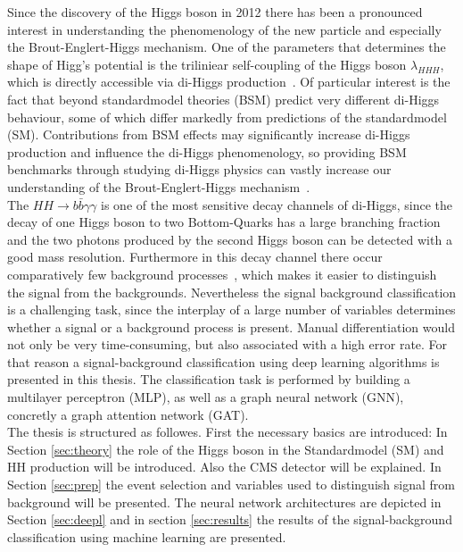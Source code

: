 \label{sec:introduction}

Since the discovery of the Higgs boson in 2012 there has been a pronounced interest in understanding the
phenomenology of the new particle and especially the Brout-Englert-Higgs mechanism. One of the parameters
that determines the shape of Higg's potential is the triliniear self-coupling of the Higgs boson $\lambda_{HHH}$,
which is directly accessible via di-Higgs production~\cite{CMS:2021qbp, HandbookLHC}. Of particular interest is the fact that beyond standardmodel theories (BSM) 
predict very different di-Higgs behaviour, some of which differ markedly from predictions of the standardmodel (SM).
Contributions from BSM effects may significantly increase di-Higgs production and influence the di-Higgs phenomenology, so providing BSM benchmarks
through studying di-Higgs physics can vastly increase our understanding of the Brout-Englert-Higgs mechanism~\cite{HandbookLHC}. \\

The $HH \rightarrow b \bar{b} \gamma \gamma$ is one of the most sensitive decay channels of di-Higgs, since the decay of one Higgs boson
to two Bottom-Quarks has a large branching fraction and the two photons produced by the second Higgs boson can be detected with a good mass resolution.
Furthermore in this decay channel there occur comparatively few background processes~\cite{CMS:2021qbp}, which makes it easier to distinguish the signal from the backgrounds.
Nevertheless the signal background classification
is a challenging task, since the interplay of a large number of variables determines whether a signal or a background process is present. Manual differentiation
would not only be very time-consuming, but also associated with a high error rate. For that reason a signal-background classification using
deep learning algorithms is presented in this thesis. The classification task is performed by building a multilayer perceptron (MLP), as well as a
graph neural network (GNN), concretly a graph attention network (GAT). \\

The thesis is structured as followes. First the necessary basics are introduced: In Section \ref{sec:theory} the role of the Higgs boson in the Standardmodel (SM) and HH production
will be introduced. Also the CMS detector will be explained. In Section \ref{sec:prep} the event selection and variables used to distinguish signal from background will be presented.
The neural network architectures are depicted in Section \ref{sec:deepl} and in section \ref{sec:results} the results of the signal-background classification using machine learning are presented.
